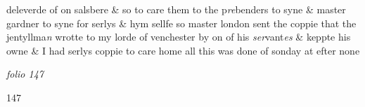 \documentclass[12pt, a4paper]{book}
\begin{document}
				\marginpar[\vspace{0.5cm}{\textcolor{Gray}{Salisbery}}]{}
			
		\ifthenelse{\isodd{\thepage}}
		{\reversemarginpar}
		{\normalmarginpar}
		deleverde of on salsbere \& so to care them to the p\textit{re}benders to
 syne \& master gardner to syne for serlys \& hym sellfe so
 		master london sent the coppie that the jentyllma\textit{n} wrotte
 		to my lorde of venchester by on of his \textit{ser}vant\textit{es} \& keppte
 his owne \& I had serlys coppie to care home all this
 was done of sonday at efter none

\dotfill
						\newpage
{}

\textit{folio 147}


\begin{flushright}{\color{Mahogany}147}\end{flushright}
 	
\end{document}
